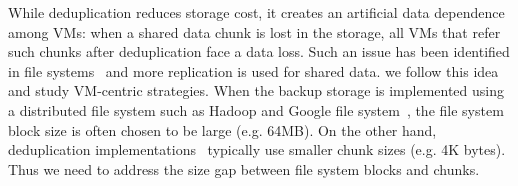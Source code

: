
While deduplication reduces storage cost, it creates an artificial data dependence among VMs: when a shared data chunk
is lost in the storage, all VMs that refer such chunks after deduplication face a data loss.
Such an issue has been identified in file systems~\cite{Reliability06}
and more replication is used for shared data. we follow this idea and study VM-centric strategies.
When the backup storage is implemented using a distributed file system such as Hadoop and 
Google file system~\cite{googlefs03},  
the file system block  size is often chosen to be large (e.g. 64MB). On the other hand, 
deduplication implementations~\cite{Guo2011,extreme_binning09,bottleneck08,Jin2009,Dong2011}
 typically use smaller chunk sizes (e.g. 4K bytes).
Thus we need to address  the size gap between file system blocks and chunks.  

